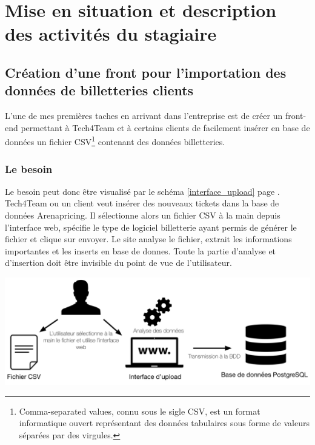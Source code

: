 \chapter{Mise en situation et description des activités du stagiaire}


\section{Création d'une front pour l'importation des données de billetteries clients}

L'une de mes premières taches en arrivant dans l'entreprise est de créer un front-end permettant à Tech4Team et à certains clients de facilement insérer en base de données un fichier CSV\footnote{Comma-separated values, connu sous le sigle CSV, est un format informatique ouvert représentant des données tabulaires sous forme de valeurs séparées par des virgules.} contenant des données billetteries.

\subsection{Le besoin}

Le besoin peut donc être visualisé par le schéma \ref{interface_upload} page \pageref{interface_upload}. Tech4Team ou un client veut insérer des nouveaux tickets dans la base de données Arenapricing. Il sélectionne alors un fichier CSV à la main depuis l'interface web, spécifie le type de logiciel billetterie ayant permis de générer le fichier et clique sur envoyer. Le site analyse le fichier, extrait les informations importantes et les inserts en base de donnes. Toute la partie d'analyse et d'insertion doit être invisible du point de vue de l'utilisateur. 

\begin{center}
\includegraphics[scale=0.6]{images/datafit.png}
\label{interface_upload}
\end{center}


